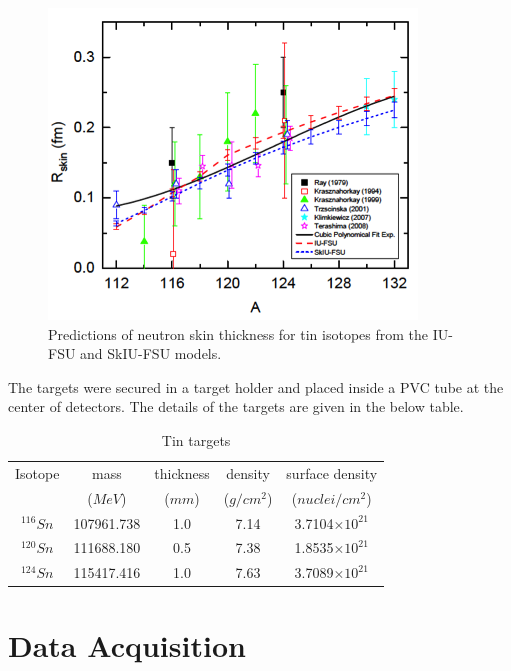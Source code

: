 \begin{figure}[H]
\begin{center}
\includegraphics[scale=0.8]{pictures/png/tiniso.png}
\caption{Predictions of neutron skin thickness for tin isotopes from the IU-FSU and SkIU-FSU models.}
\label{isochain}
\end{center}
\end{figure} 

\indent The targets were secured in a target holder and placed inside a PVC tube at the center of detectors. The details of the targets are given in the below table.

\newcommand{\ra}[1]{\renewcommand{\arraystretch}{#1}}
\begin{table}[ht]
\ra{1.5}
\caption{Tin targets}
\centering
\begin{tabular}{c c c c c}
\hline\hline
Isotope & mass & thickness & density  & surface density  \\
 & ($MeV$) & ($mm$) & ($g/cm^{2}$) & ($nuclei/cm^{2}$) \\
\hline
$^{116}Sn$ & 107961.738 & 1.0 & 7.14 & 3.7104$\times 10^{21}$ \\
\hline
$^{120}Sn$ & 111688.180 & 0.5 & 7.38 & 1.8535$\times 10^{21}$ \\
\hline
$^{124}Sn$ & 115417.416 & 1.0 & 7.63 & 3.7089$\times 10^{21}$ \\
\hline\hline
\end{tabular}
\label{table_targets}
\end{table} 

\section{Data Acquisition}

